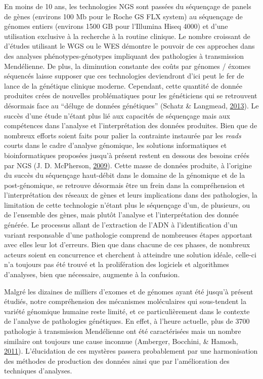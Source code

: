 \documentclass[12pt,twoside]{reedthesis}
\theoremstyle{definition}
\theoremstyle{definition}
\theoremstyle{remark}
\begin{document}
  En moins de 10 ans, les technologies NGS sont passées du séquençage de
  panels de gènes (environs 100 Mb pour le Roche GS FLX system) au
  séquençage de génomes entiers (environs 1500 GB pour l'Illumina Hiseq
  4000) et d'une utilisation exclusive à la recherche à la routine
  clinique. Le nombre croissant de d'études utilisant le WGS ou le WES
  démontre le pouvoir de ces approches dans des analyses
  phénotypes-génotypes impliquant des pathologies à transmission
  Mendélienne. De plus, la diminution constante des coûts par génomes /
  éxomes séquencés laisse supposer que ces technologies deviendront d'ici
  peut le fer de lance de la génétique clinique moderne. Cependant, cette
  quantité de donnée produites crées de nouvelles problématiques pour les
  généticiens qui se retrouvent désormais face au ``déluge de données
  génétiques'' (Schatz \& Langmead,
  \protect\hyperlink{ref-Schatz2013}{2013}). Le succès d'une étude n'étant
  plus lié aux capacités de séquençage mais aux compétences dans l'analyse
  et l'interprétation des données produites. Bien que de nombreux efforts
  soient faits pour palier la contrainte instaurée par les \emph{reads}
  courts dans le cadre d'analyse génomique, les solutions informatiques et
  bioinformatiques proposées jusqu'à présent restent en dessous des
  besoins créés par NGS (J. D. McPherson,
  \protect\hyperlink{ref-McPherson2009}{2009}). Cette masse de données
  produite, à l'origine du succès du séquençage haut-débit dans le domaine
  de la génomique et de la post-génomique, se retrouve désormais être un
  frein dans la compréhension et l'interprétation des réseaux de gènes et
  leurs implications dans des pathologies, la limitation de cette
  technologie n'étant plus le séquençage d'un, de plusieurs, ou de
  l'ensemble des gènes, mais plutôt l'analyse et l'interprétation des
  donnée générée. Le processus allant de l'extraction de l'ADN à
  l'identification d'un variant responsable d'une pathologie comprend de
  nombreuses étapes apportant avec elles leur lot d'erreurs. Bien que dans
  chacune de ces phases, de nombreux acteurs soient en concurrence et
  cherchent à atteindre une solution idéale, celle-ci n'a toujours pas été
  trouvé et la prolifération des logiciels et algorithmes d'analyses, bien
  que nécessaire, augmente à la confusion.
  
  Malgré les dizaines de milliers d'exomes et de génomes ayant été jusqu'à
  présent étudiés, notre compréhension des mécanismes moléculaires qui
  sous-tendent la variété génomique humaine reste limité, et ce
  particulièrement dans le contexte de l'analyse de pathologies
  génétiques. En effet, à l'heure actuelle, plus de 3700 pathologie à
  transmission Mendélienne ont été caractérisées mais un nombre similaire
  ont toujours une cause inconnue (Amberger, Bocchini, \& Hamosh,
  \protect\hyperlink{ref-Amberger2011}{2011}). L'élucidation de ces
  mystères passera probablement par une harmonisation des méthodes de
  production des données ainsi que par l'amélioration des techniques
  d'analyses.
  
\end{document}
